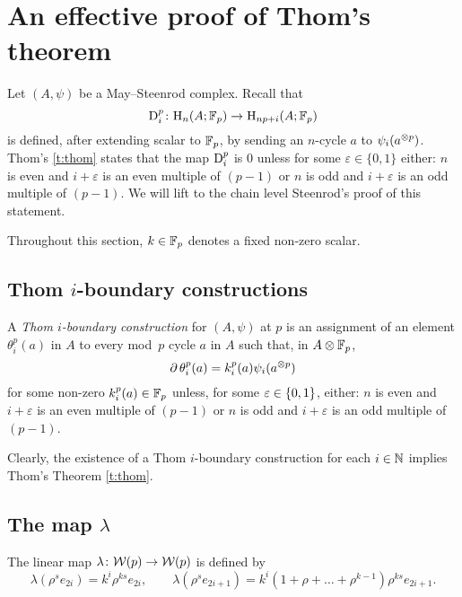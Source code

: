 
\appendix
\section{An effective proof of Thom's theorem}\label{s:thom}


Let $(A,\psi)$ be a May--Steenrod complex.
Recall that
\[
\mathrm{D}_i^p \colon \mathrm{H}_n(A; {\mathbb{F}_p}) \to \mathrm{H}_{np+i}(A; {\mathbb{F}_p})
\]
is defined, after extending scalar to ${\mathbb{F}_p}$, by sending an $n$-cycle $a$ to $\psi_i(a^{\otimes p})$.
Thom's \cref{t:thom} states that the map $\mathrm{D}_i^p$ is $0$ unless for some $\varepsilon \in \{0,1\}$ either: $n$ is even and $i+\varepsilon$ is an even multiple of $(p-1)$ or $n$ is odd and $i+\varepsilon$ is an odd multiple of $(p-1)$.
We will lift to the chain level Steenrod's proof of this statement.

Throughout this section, $k \in {\mathbb{F}_p}$ denotes a fixed non-zero scalar.

\subsection{Thom $i$-boundary constructions}

\begin{definition}
	A \textit{Thom $i$-boundary construction} for $(A,\psi)$ at $p$ is an assignment of an element $\theta_i^p(a)$ in $A$ to every mod~$p$ cycle $a$ in $A$ such that, in $A \otimes {\mathbb{F}_p}$,
	\[
	\operatorname{\partial} \theta_i^p(a) = k_i^p(a) \psi_i(a^{\otimes p})
	\]
	for some non-zero $k^p_i(a) \in {\mathbb{F}_p}$ unless, for some $\varepsilon \in \{0,1\}$, either: $n$ is even and $i+\varepsilon$ is an even multiple of $(p-1)$ or $n$ is odd and $i+\varepsilon$ is an odd multiple of $(p-1)$.
\end{definition}

Clearly, the existence of a Thom $i$-boundary construction for each $i \in \mathbb{N}$ implies Thom's Theorem \cref{t:thom}.

\subsection{The map $\lambda$}

\begin{definition}
	The linear map $\lambda \colon \mathcal{W}(p) \to \mathcal{W}(p)$ is defined by
	\[
	\lambda(\rho^s e_{2i}) = k^i \rho^{ks} e_{2i}, \qquad
	\lambda(\rho^s e_{2i+1}) = k^i (1+\rho+\dots+\rho^{k-1}) \rho^{ks} e_{2i+1}.
	\]
\end{definition}

